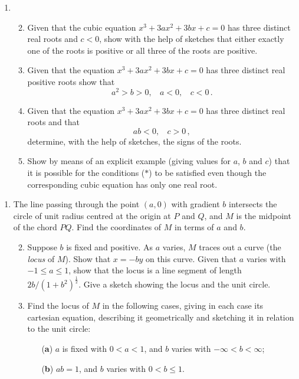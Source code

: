 \documentclass[a4, 11pt]{report}
\newlength{\qspace}
\newcounter{qnumber}
\newenvironment{question}%
 {\vspace{\qspace}
  \begin{enumerate}[\bfseries 1\quad][10]%
    \setcounter{enumi}{\value{qnumber}}%
    \item%
 }
{
  \end{enumerate}
  \filbreak
  \stepcounter{qnumber}
 }
\newenvironment{questionparts}[1][1]%
 {
  \begin{enumerate}[\bfseries (i)]%
    \setcounter{enumii}{#1}
    \addtocounter{enumii}{-1}
    \setlength{\itemsep}{5mm}
    \setlength{\parskip}{8pt}
 }
 {
  \end{enumerate}
 }
\def\le{\leqslant}
\begin{document}
\begin{question}
\begin{questionparts}
\item 
Given that the cubic equation
$x^3+3ax^2 + 3bx +c=0$ has three distinct real roots and $c<0$, 
show with the help of sketches that
either exactly one of the roots is positive 
or all three of the roots are positive.
 
\item 
Given that the     
equation $x^3 +3ax^2+3bx+c=0$ has three distinct real positive roots 
show that
\begin{equation*}
a^2>b>0, \ \ \ \ a<0, \ \ \ \ c<0\,.
\tag{$*$}
\end{equation*}

\item Given that the 
equation $x^3 +3ax^2+3bx+c=0$ has three distinct real roots and that
\begin{equation*}
 ab<0, \ \ \ \ c>0\,,
\end{equation*}
determine, with the help of sketches,  the signs of the roots.
  
\item 
Show by means of an explicit example 
(giving values for $a$, $b$ and $c$)
that it is possible 
for  the conditions ($*$) to be satisfied even though
the corresponding cubic equation 
has only one real root.               

\end{questionparts}
\end{question}

\begin{question}
The line passing through the point $(a,0)$ with gradient $b$ intersects 
the circle of unit radius centred at the origin at $P$ and $Q$, and $M$ is the
midpoint of
 the chord $PQ$.
Find the coordinates of $M$ in terms of $a$ and $b$.

\begin{questionparts}
 
\item Suppose $b$ is fixed and positive. As  
$a$ varies,  $M$  traces out a curve (the {\em locus} of $M$).
Show that 
$x=- by$
on this curve.
Given that  $a$ varies with $-1\le a \le 1$, 
 show that the locus is a line 
segment of length~$2b/(1+b^2)^\frac12$.
Give
a sketch 
showing the locus 
and the unit circle. 


\item Find the locus of $M$ in the following cases, giving in
each case its cartesian equation, describing it geometrically and sketching
it in relation to the unit circle:
\begin{itemize}

\item [({\bf a})] $a$ is fixed with $0<a<1$, and $b$ varies 
with  $-\infty <b< \infty$;

\item [({\bf b})] $ab=1$, and $b$  varies  with  
 $0<b\le1$.
\end{itemize}
\end{questionparts}
\end{question}
\end{document}
